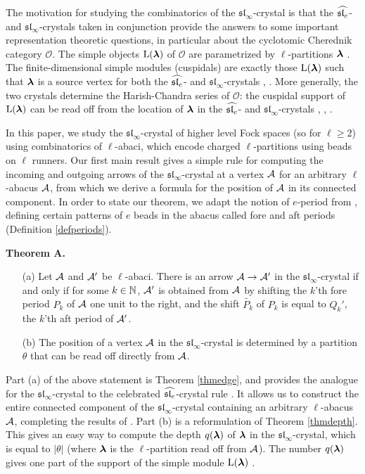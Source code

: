 \documentclass[12pt]{amsart}
\numberwithin{equation}{section}
\theoremstyle{definition}
\newcommand{\oh}{\mathcal{O}}
\newcommand{\el}{\mathrm{L}}
\newcommand{\slinf}{\mathfrak{sl}_\infty}
\begin{document}
The motivation for studying the combinatorics of the $\slinf$-crystal is that the $\widehat{\mathfrak{sl}_e}$- and $\slinf$-crystals taken in conjunction provide the answers to some important representation theoretic questions, 
in particular about the cyclotomic Cherednik category $\oh$. 
The simple objects $\el(\bla)$ of $\oh$ are parametrized by $\ell$-partitions $\boldsymbol{\lambda}$ \cite{GGOR}. 
The finite-dimensional simple modules (cuspidals) are exactly those $\el(\bla)$ such that $\boldsymbol{\lambda}$ is a source vertex for both the $\widehat{\mathfrak{sl}_e}$- and $\slinf$-crystals \cite{ShanVasserot2012}, \cite{Losev2015}. 
More generally, the two crystals determine the Harish-Chandra series of $\oh$: the cuspidal support of $\el(\bla)$ can be read off from the location of $\boldsymbol{\lambda}$ in the $\widehat{\mathfrak{sl}_e}$- and $\slinf$-crystals \cite{ShanVasserot2012}, \cite{Losev2015}, \cite{LosevSA}.

In this paper, we study the $\slinf$-crystal of higher level Fock spaces (so for $\ell\geq 2$) using combinatorics of $\ell$-abaci, which encode charged $\ell$-partitions using beads on $\ell$ runners.
Our first main result gives a simple rule for computing the incoming and outgoing arrows of the $\slinf$-crystal at a vertex $\mathcal{A}$ for an arbitrary $\ell$-abacus $\mathcal{A}$,
from which we derive a formula for the position of $\mathcal{A}$ in its connected component.
In order to state our theorem, we adapt the notion of $e$-period from \cite{JaconLecouvey2012}, defining certain patterns of $e$ beads in the abacus called fore and aft periods (Definition \ref{defperiods}).

\medskip

\textbf{Theorem A.} 
\begin{enumerate}
\item[(a)] Let $\mathcal{A}$ and $\mathcal{A}'$ be $\ell$-abaci. There is an arrow $\mathcal{A}\to\mathcal{A}'$ in the $\slinf$-crystal if and only if for some $k\in\mathbb{N}$, $\mathcal{A}'$ is obtained from $\mathcal{A}$ by shifting the $k$'th fore period $P_k$ of $\mathcal{A}$ one unit to the right, and the shift $\tilde{P_k}$ of $P_k$ is equal to $Q_k'$, the $k$'th aft period of $\mathcal{A}'$.
\item[(b)] The position of a vertex $\mathcal{A}$ in the $\slinf$-crystal is determined by a partition $\theta$ that can be read off directly from $\mathcal{A}$.
\end{enumerate}

\medskip

Part (a) of the above statement is Theorem \ref{thmedge}, and provides the analogue for the $\slinf$-crystal to the celebrated $\widehat{\mathfrak{sl}_e}$-crystal rule \cite{FLOTW1999}. 
It allows us to construct the entire connected component of the $\slinf$-crystal containing an arbitrary $\ell$-abacus $\mathcal{A}$, completing the results of \cite[Section 5]{Gerber2016a}.
Part (b) is a reformulation of Theorem \ref{thmdepth}. This gives an easy way to compute the depth $q(\boldsymbol{\lambda})$ of $\boldsymbol{\lambda}$ in the $\slinf$-crystal, which is equal to $|\theta|$
(where $\boldsymbol{\lambda}$ is the $\ell$-partition read off from $\mathcal{A}$). The number $q(\boldsymbol{\lambda})$ gives one part of the support of the simple module $\el(\bla)$ \cite{Losev2015}. 
\end{document}
